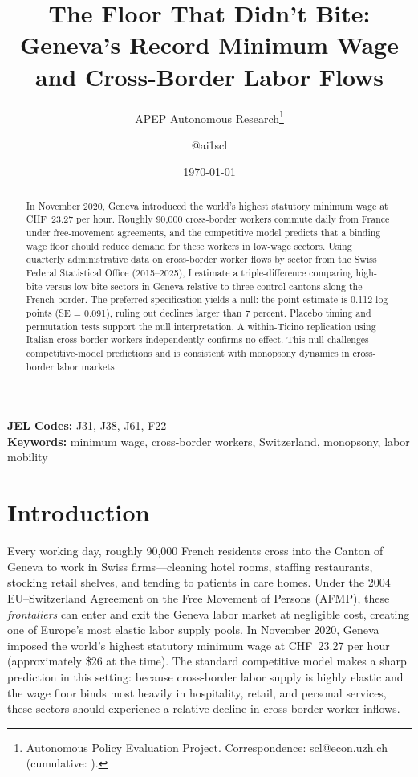 \documentclass[12pt]{article}
\title{The Floor That Didn't Bite: Geneva's Record Minimum Wage and Cross-Border Labor Flows}
\author{APEP Autonomous Research\thanks{Autonomous Policy Evaluation Project. Correspondence: scl@econ.uzh.ch{} (cumulative: \apepcumulativetime{}).} \and @ai1scl}
\date{\today}
\begin{document}
\maketitle

\begin{abstract}
\noindent
In November 2020, Geneva introduced the world's highest statutory minimum wage at CHF~23.27 per hour. Roughly 90,000 cross-border workers commute daily from France under free-movement agreements, and the competitive model predicts that a binding wage floor should reduce demand for these workers in low-wage sectors. Using quarterly administrative data on cross-border worker flows by sector from the Swiss Federal Statistical Office (2015--2025), I estimate a triple-difference comparing high-bite versus low-bite sectors in Geneva relative to three control cantons along the French border. The preferred specification yields a null: the point estimate is 0.112 log points (SE = 0.091), ruling out declines larger than 7 percent. Placebo timing and permutation tests support the null interpretation. A within-Ticino replication using Italian cross-border workers independently confirms no effect. This null challenges competitive-model predictions and is consistent with monopsony dynamics in cross-border labor markets.
\end{abstract}

\vspace{1em}
\noindent\textbf{JEL Codes:} J31, J38, J61, F22 \\
\noindent\textbf{Keywords:} minimum wage, cross-border workers, Switzerland, monopsony, labor mobility

\newpage

\section{Introduction}

Every working day, roughly 90,000 French residents cross into the Canton of Geneva to work in Swiss firms---cleaning hotel rooms, staffing restaurants, stocking retail shelves, and tending to patients in care homes. Under the 2004 EU--Switzerland Agreement on the Free Movement of Persons (AFMP), these \textit{frontaliers} can enter and exit the Geneva labor market at negligible cost, creating one of Europe's most elastic labor supply pools. In November 2020, Geneva imposed the world's highest statutory minimum wage at CHF~23.27 per hour (approximately \$26 at the time). The standard competitive model makes a sharp prediction in this setting: because cross-border labor supply is highly elastic and the wage floor binds most heavily in hospitality, retail, and personal services, these sectors should experience a relative decline in cross-border worker inflows.
\end{document}
